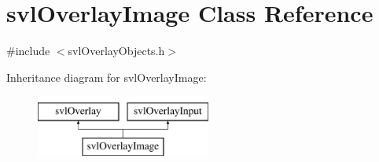 \hypertarget{classsvl_overlay_image}{}\section{svl\+Overlay\+Image Class Reference}
\label{classsvl_overlay_image}


{\ttfamily \#include $<$svl\+Overlay\+Objects.\+h$>$}

Inheritance diagram for svl\+Overlay\+Image\+:\begin{figure}[H]
\begin{center}
\leavevmode
\includegraphics[height=2.000000cm]{dc/d72/classsvl_overlay_image}
\end{center}
\end{figure}
